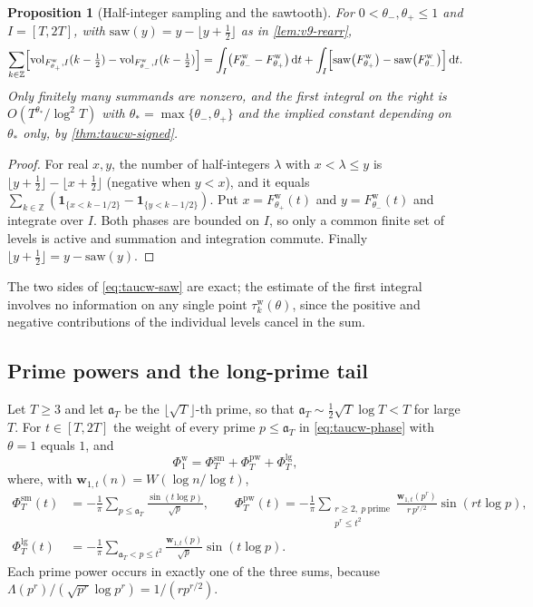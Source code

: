 \documentclass[11pt,a4paper]{article}
\numberwithin{equation}{section}
\newtheorem{proposition}[theorem]{Proposition}
\theoremstyle{definition}
\theoremstyle{remark}
\newcommand{\ind}{\mathbf 1}
\newcommand{\vol}{\operatorname{vol}}
\newcommand{\dd}{\,\mathrm dt}
\begin{document}
\begin{proposition}[Half-integer sampling and the sawtooth]\label{prop:taucw-saw}
For $0<\theta_-,\theta_+\le1$ and $I=[T,2T]$, with $\mathrm{saw}(y)=y-\lfloor y+\frac12\rfloor$ as in \cref{lem:v9-rearr},
\begin{equation}\label{eq:taucw-saw}
\sum_{k\in\mathbb Z}\Bigl[\vol_{F^{\mathrm w}_{\theta_+},I}(k-\tfrac12)-\vol_{F^{\mathrm w}_{\theta_-},I}(k-\tfrac12)\Bigr]
=\int_I\bigl(F^{\mathrm w}_{\theta_-}-F^{\mathrm w}_{\theta_+}\bigr)\dd+\int_I\Bigl[\mathrm{saw}\bigl(F^{\mathrm w}_{\theta_+}\bigr)-\mathrm{saw}\bigl(F^{\mathrm w}_{\theta_-}\bigr)\Bigr]\dd.
\end{equation}
Only finitely many summands are nonzero, and the first integral on the right is $O(T^{\theta_*}/\log^2T)$ with $\theta_*=\max\{\theta_-,\theta_+\}$ and the implied constant depending on $\theta_*$ only, by \cref{thm:taucw-signed}.
\end{proposition}
\begin{proof}
For real $x,y$, the number of half-integers $\lambda$ with $x<\lambda\le y$ is $\lfloor y+\frac12\rfloor-\lfloor x+\frac12\rfloor$ (negative when $y<x$), and it equals $\sum_{k\in\mathbb Z}(\ind_{\{x<k-1/2\}}-\ind_{\{y<k-1/2\}})$. Put $x=F^{\mathrm w}_{\theta_+}(t)$ and $y=F^{\mathrm w}_{\theta_-}(t)$ and integrate over $I$. Both phases are bounded on $I$, so only a common finite set of levels is active and summation and integration commute. Finally $\lfloor y+\frac12\rfloor=y-\mathrm{saw}(y)$.
\end{proof}
The two sides of \eqref{eq:taucw-saw} are exact; the estimate of the first integral involves no information on any single point $\tau_k^{\mathrm w}(\theta)$, since the positive and negative contributions of the individual levels cancel in the sum.

\subsection{Prime powers and the long-prime tail}\label{sec:taucw-powers}
Let $T\ge3$ and let $\mathfrak a_T$ be the $\lfloor\sqrt T\rfloor$-th prime, so that $\mathfrak a_T\sim\frac12\sqrt T\log T<T$ for large $T$. For $t\in[T,2T]$ the weight of every prime $p\le\mathfrak a_T$ in \eqref{eq:taucw-phase} with $\theta=1$ equals $1$, and
\begin{equation}\label{eq:taucw-split}
\Phi^{\mathrm w}_1=\Phi^{\mathrm{sm}}_T+\Phi^{\mathrm{pw}}_T+\Phi^{\mathrm{lg}}_T,
\end{equation}
where, with $\mathbf w_{1,t}(n)=W(\log n/\log t)$,
\begin{align}
\Phi^{\mathrm{sm}}_T(t)&=-\frac1\pi\sum_{p\le\mathfrak a_T}\frac{\sin(t\log p)}{\sqrt p},\qquad
\Phi^{\mathrm{pw}}_T(t)=-\frac1\pi\sum_{\substack{r\ge2,\ p\ \mathrm{prime}\\p^r\le t^2}}\frac{\mathbf w_{1,t}(p^r)}{r\,p^{r/2}}\sin(rt\log p),\label{eq:taucw-sm}\\
\Phi^{\mathrm{lg}}_T(t)&=-\frac1\pi\sum_{\mathfrak a_T<p\le t^2}\frac{\mathbf w_{1,t}(p)}{\sqrt p}\sin(t\log p).\label{eq:taucw-lg}
\end{align}
Each prime power occurs in exactly one of the three sums, because $\Lambda(p^r)/(\sqrt{p^r}\log p^r)=1/(rp^{r/2})$.
\end{document}
